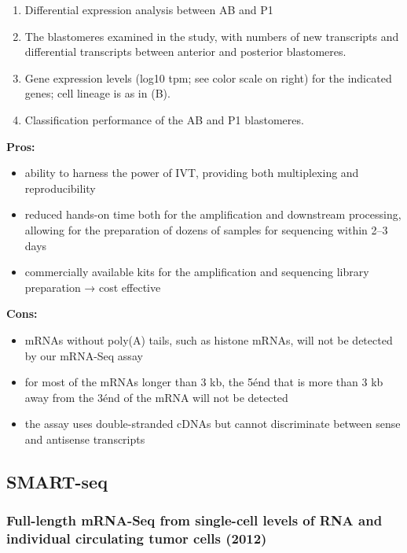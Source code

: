 \begin{enumerate}
\def\labelenumi{(\Alph{enumi})}
\tightlist
\item
  Differential expression analysis between AB and P1
\item
  The blastomeres examined in the study, with numbers of new transcripts
  and differential transcripts between anterior and posterior
  blastomeres.
\item
  Gene expression levels (log10 tpm; see color scale on right) for the
  indicated genes; cell lineage is as in (B).
\item
  Classification performance of the AB and P1 blastomeres.
\end{enumerate}

\textbf{Pros:}

\begin{itemize}
\tightlist
\item
  ability to harness the power of IVT, providing both multiplexing and
  reproducibility
\item
  reduced hands-on time both for the amplification and downstream
  processing, allowing for the preparation of dozens of samples for
  sequencing within 2--3 days
\item
  commercially available kits for the amplification and sequencing
  library preparation → cost effective
\end{itemize}

\textbf{Cons:}

\begin{itemize}
\tightlist
\item
  mRNAs without poly(A) tails, such as histone mRNAs, will not be
  detected by our mRNA-Seq assay
\item
  for most of the mRNAs longer than 3 kb, the 5\' end that is more than 3
  kb away from the 3\' end of the mRNA will not be detected
\item
  the assay uses double-stranded cDNAs but cannot discriminate between
  sense and antisense transcripts
\end{itemize}

\hypertarget{smart-seq}{%
\subsection{SMART-seq}\label{smart-seq}}

\hypertarget{full-length-mrna-seq-from-single-cell-levels-of-rna-and-individual-circulating-tumor-cells-2012}{%
\subsubsection{Full-length mRNA-Seq from single-cell levels of RNA and
individual circulating tumor cells
(2012)}\label{full-length-mrna-seq-from-single-cell-levels-of-rna-and-individual-circulating-tumor-cells-2012}}

